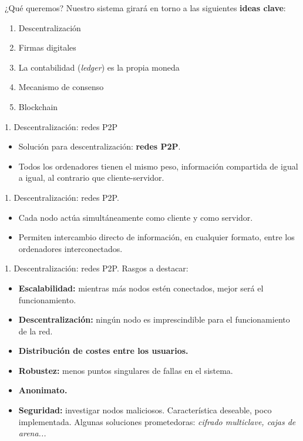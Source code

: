 \documentclass[10pt, xcolor=table]{beamer}
\begin{document}
\begin{frame}{¿Qué queremos?}
Nuestro sistema girará en torno a las siguientes \textbf{ideas clave}:
\begin{enumerate}
\item Descentralización
\item Firmas digitales
\item La contabilidad (\emph{ledger}) es la propia moneda
\item Mecanismo de consenso
\item Blockchain
\end{enumerate}
\end{frame}

\begin{frame}{1. Descentralización: redes P2P}

\begin{itemize}
	\item Solución para descentralización: \textbf{redes P2P}.
	\item Todos los ordenadores tienen el mismo peso, información compartida de igual a igual, al contrario que cliente-servidor.
\end{itemize}

\end{frame}

\begin{frame}{1. Descentralización: redes P2P. }

\begin{itemize}
	\item Cada nodo actúa simultáneamente como cliente y como servidor.
	\item Permiten intercambio directo de información, en cualquier formato, entre los ordenadores interconectados.
\end{itemize}

\end{frame}

\begin{frame}{1. Descentralización: redes P2P. }
Rasgos a destacar:

\begin{itemize}
	\item \textbf{Escalabilidad:} mientras más nodos estén conectados, mejor será el funcionamiento.
	\item \textbf{Descentralización:} ningún nodo es imprescindible para el funcionamiento de la red.
	\item \textbf{Distribución de costes entre los usuarios.}
	\item \textbf{Robustez:} menos puntos singulares de fallas en el sistema.
	\item \textbf{Anonimato.}
	\item \textbf{Seguridad:} investigar nodos maliciosos. Característica deseable, poco implementada. Algunas soluciones prometedoras: \emph{cifrado multiclave, cajas de arena...}
\end{itemize}

\end{frame}
\end{document}

